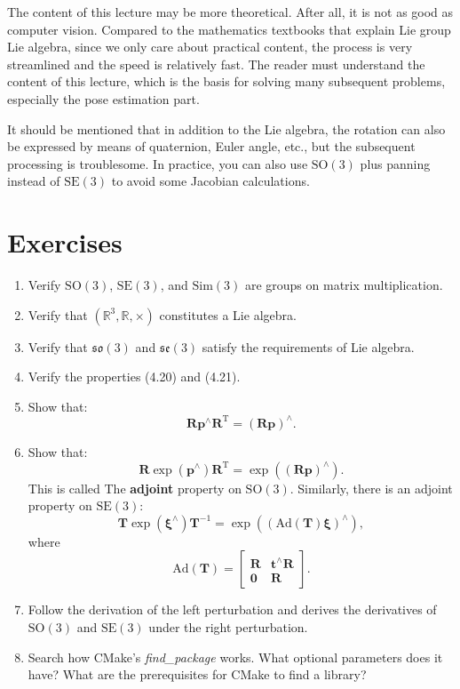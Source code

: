 The content of this lecture may be more theoretical. After all, it is not as good as computer vision. Compared to the mathematics textbooks that explain Lie group Lie algebra, since we only care about practical content, the process is very streamlined and the speed is relatively fast. The reader must understand the content of this lecture, which is the basis for solving many subsequent problems, especially the pose estimation part.

It should be mentioned that in addition to the Lie algebra, the rotation can also be expressed by means of quaternion, Euler angle, etc., but the subsequent processing is troublesome. In practice, you can also use $\mathrm{SO}(3)$ plus panning instead of $\mathrm{SE}(3)$ to avoid some Jacobian calculations.

\section*{Exercises}
\begin{enumerate}
    \item Verify $\mathrm{SO}(3)$, $\mathrm{SE}(3)$, and $\mathrm{Sim}(3)$ are groups on matrix multiplication.
    \item Verify that $( \mathbb{R}^3, \mathbb{R}, \times )$ constitutes a Lie algebra.
    \item Verify that $\mathfrak{so}(3)$ and $\mathfrak{se}(3)$ satisfy the requirements of Lie algebra.
    \item Verify the properties (4.20) and (4.21).
    \item Show that: \[
    \mathbf{R} \mathbf{p}^\wedge \mathbf{R}^\mathrm{T} = (\mathbf{Rp})^\wedge .\]
    \item Show that: \[
    \mathbf{R} \exp( \mathbf{p}^\wedge) \mathbf{R}^\mathrm{T} = \exp( (\mathbf{Rp})^\wedge ).\] This is called The \textbf{adjoint} property on $\mathrm{SO}(3)$. Similarly, there is an adjoint property on $\mathrm{SE}(3)$:
    \begin{equation}
    \mathbf{T} \exp(\boldsymbol{\xi}^\wedge)\mathbf{T}^{-1} = \exp \left( \left( \mathrm{Ad}(\mathbf{T}) \boldsymbol{\xi} \right) ^\wedge \right),
    \end{equation}
    where
    \begin{equation}
    \label{eq:adjSE3}
    \mathrm{Ad} ( \mathbf{T} ) = \left[ {\begin{array}{*{20}{c}}
        \mathbf{R} &{{ \mathbf{t} ^ \wedge } \mathbf{R} }\\
        \mathbf{0} & \mathbf{R}
        \end{array}} \right].
    \end{equation}
    \item Follow the derivation of the left perturbation and derives the derivatives of $\mathrm{SO}(3)$ and $\mathrm{SE}(3)$ under the right perturbation.
    \item Search how CMake's \textit{find\_package} works. What optional parameters does it have? What are the prerequisites for CMake to find a library?
\end{enumerate}
